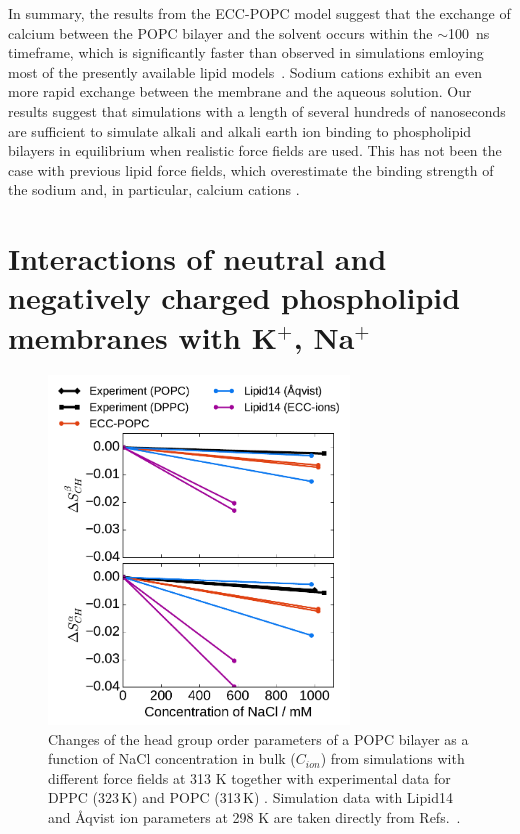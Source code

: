 In summary, the results from the ECC-POPC model suggest that the exchange of calcium between the POPC bilayer and the solvent occurs within the $\sim$100~ns timeframe, which is significantly faster than observed in simulations emloying most of the presently available lipid models~\citep{javanainen17}. Sodium cations exhibit an even more rapid exchange between the membrane and the aqueous solution. Our results suggest that simulations with a length of several hundreds of nanoseconds are sufficient to simulate alkali and alkali earth ion binding to phospholipid bilayers in equilibrium when realistic force fields are used. This has not been the case with previous lipid force fields, which overestimate the binding strength of the sodium and, in particular,  calcium cations \citep{javanainen17, catte16}. 
 
 








\section{Interactions of neutral and negatively charged phospholipid membranes with K$^+$, Na$^+$}


\begin{figure}[htb!] 
  \centering 
  \includegraphics[width=8.0cm]{../img/ecc_popc/OrdPars-A-B_L14-ECCL17_q80_sig89_NaCl.pdf} 
  \caption{\label{fig:delta_ordPar_NaCl} 
    Changes of the head group order parameters of a POPC bilayer as a function of NaCl concentration 
    in bulk ($C_{ion}$) from simulations with different force fields at 313 K together with  
    experimental data for DPPC (323\,K) \citep{akutsu81} and POPC (313\,K) \citep{altenbach84}. 
    Simulation data with Lipid14 and Åqvist ion parameters at 298 K are taken directly from 
    Refs.~\citep{lipid14POPC0mMNaClfiles,lipid14POPC1000mMNaClfiles}. 
  } 
\end{figure} 
 
